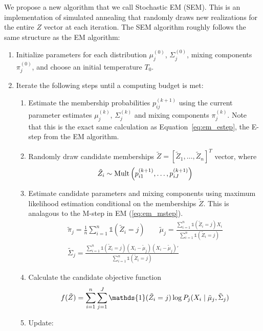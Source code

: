 \documentclass{article}
\newcommand*{\I}{\mathds{1}}
\newcommand*{\cond}{\;\ifnum\currentgrouptype=16 \middle\fi|\;}
\newcommand*{\mt}[1]{\text{\normalfont #1}}
\newcommand*{\dist}{\sim}
\theoremstyle{definition}
\theoremstyle{algodesc}
\begin{document}
We propose a new algorithm that we call Stochastic EM (SEM). This is an implementation of simulated annealing that randomly draws new realizations for the entire $Z$ vector at each iteration. The SEM algorithm roughly follows the same structure as the EM algorithm:
\begin{enumerate}
\item Initialize parameters for each distribution $\mu_j^{(0)}$, $\Sigma_j^{(0)}$, mixing components $\pi_j^{(0)}$, and choose an initial temperature $T_0$.
\item Iterate the following steps until a computing budget is met:
  \begin{enumerate}
  \item Estimate the membership probabilities $p_{ij}^{(k+1)}$ using the current parameter estimates $\mu_j^{(k)}$, $\Sigma_j^{(k)}$ and mixing components $\pi_j^{(k)}$. Note that this is the exact same calculation as Equation~\ref{eq:em_estep}, the E-step from the EM algorithm.
  \item Randomly draw candidate memberships $\tilde{Z}=\left[\tilde{Z}_1,\ldots,\tilde{Z}_n\right]^T$ vector, where
    \begin{equation*}
    \tilde{Z}_i \dist \mt{Mult}\left(p_{i1}^{(k+1)}, \dots, p_{iJ}^{(k+1)}\right)
    \end{equation*}
  \item Estimate candidate parameters and mixing components using maximum likelihood estimation conditional on the memberships $\tilde{Z}$. This is analagous to the M-step in EM (\ref{eq:em_mstep}).
    \begin{equation} \label{eq:sa_mstep}
    \begin{gathered}
    \tilde{\pi}_j = \frac{1}{n} \sum_{i=1}^n \I(\tilde{Z}_i = j) \qquad
    \tilde{\mu}_j = \frac{\sum_{i=1}^n \I(\tilde{Z}_i = j) X_i}{\sum_{i=1}^n \I(\tilde{Z}_i = j)} \\
    \tilde{\Sigma}_j = \frac{\sum_{i=1}^n \I(\tilde{Z}_i = j) (X_i - \tilde{\mu}_j) (X_i - \tilde{\mu}_j)'}{\sum_{i=1}^n \I(\tilde{Z}_i = j)}
    \end{gathered}
    \end{equation}
  \item Calculate the candidate objective function
    \begin{equation*}
    f(\tilde{Z}) = \sum_{i=1}^n \sum_{j=1}^J \I(\tilde{Z}_i = j) \log P_j(X_i \cond \tilde{\mu}_j, \tilde{\Sigma}_j)
    \end{equation*}
  \item Update:

\end{enumerate}
\end{enumerate}
\end{document}
